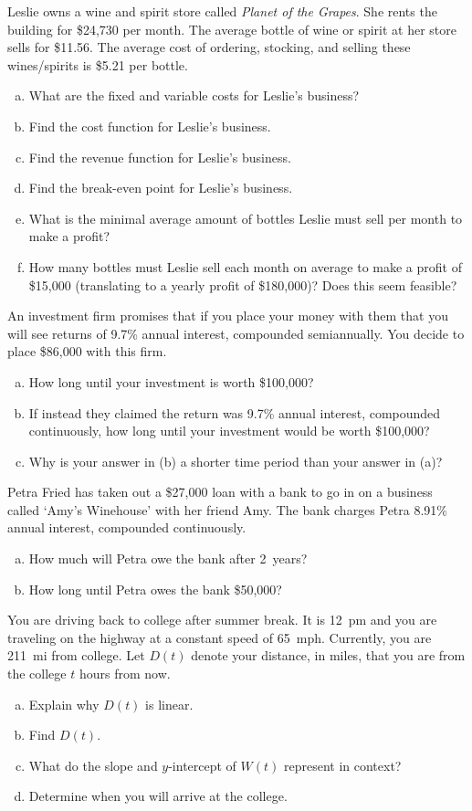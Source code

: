 \documentclass[11pt,letterpaper]{article}
\begin{document}
	
\prob Leslie owns a wine and spirit store called \textit{Planet of the Grapes}. She rents the building for \$24,730 per month. The average bottle of wine or spirit at her store sells for \$11.56. The average cost of ordering, stocking, and selling these wines/spirits is \$5.21 per bottle. 
	\begin{enumerate}[(a)]
	\item What are the fixed and variable costs for Leslie's business?
	\item Find the cost function for Leslie's business.
	\item Find the revenue function for Leslie's business.
	\item Find the break-even point for Leslie's business. 
	\item What is the minimal average amount of bottles Leslie must sell per month to make a profit?
	\item How many bottles must Leslie sell each month on average to make a profit of \$15,000 (translating to a yearly profit of \$180,000)? Does this seem feasible?	
	\end{enumerate} \pspace	
	

\prob An investment firm promises that if you place your money with them that you will see returns of 9.7\% annual interest, compounded semiannually. You decide to place \$86,000 with this firm. 
	\begin{enumerate}[(a)]
	\item How long until your investment is worth \$100,000?
	\item If instead they claimed the return was 9.7\% annual interest, compounded continuously, how long until your investment would be worth \$100,000?
	\item Why is your answer in (b) a shorter time period than your answer in (a)?
	\end{enumerate} \pspace	
	

\prob Petra Fried has taken out a \$27,000 loan with a bank to go in on a business called `Amy's Winehouse' with her friend Amy. The bank charges Petra 8.91\% annual interest, compounded continuously. 
	\begin{enumerate}[(a)]
	\item How much will Petra owe the bank after 2~years?
	\item How long until Petra owes the bank \$50,000? 
	\end{enumerate} \pspace	
	

\prob You are driving back to college after summer break. It is 12~pm and you are traveling on the highway at a constant speed of 65~mph. Currently, you are 211~mi from college. Let $D(t)$ denote your distance, in miles, that you are from the college $t$ hours from now. 
	\begin{enumerate}[(a)]
	\item Explain why $D(t)$ is linear.
	\item Find $D(t)$. 
	\item What do the slope and $y$-intercept of $W(t)$ represent in context?
	\item Determine when you will arrive at the college. 
	\end{enumerate} \pspace 	
	
\end{document}
